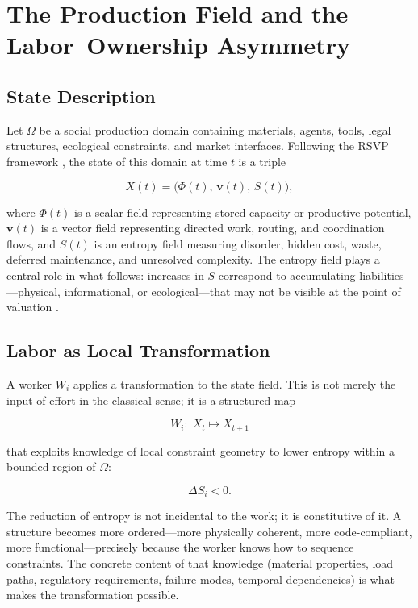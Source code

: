 \documentclass[12pt]{article}
\begin{document}
\section{The Production Field and the Labor--Ownership Asymmetry}

\subsection{State Description}

Let $\Omega$ be a social production domain containing materials, agents, tools, legal structures, ecological constraints, and market interfaces. Following the RSVP framework \cite{GeorgescuRoegen1971,Odum1994}, the state of this domain at time $t$ is a triple

\begin{equation}
X(t) = \bigl(\Phi(t),\, \mathbf{v}(t),\, S(t)\bigr),
\end{equation}

where $\Phi(t)$ is a scalar field representing stored capacity or productive potential, $\mathbf{v}(t)$ is a vector field representing directed work, routing, and coordination flows, and $S(t)$ is an entropy field measuring disorder, hidden cost, waste, deferred maintenance, and unresolved complexity. The entropy field plays a central role in what follows: increases in $S$ correspond to accumulating liabilities---physical, informational, or ecological---that may not be visible at the point of valuation \cite{Shannon1948,GeorgescuRoegen1971}.

\subsection{Labor as Local Transformation}

A worker $W_i$ applies a transformation to the state field. This is not merely the input of effort in the classical sense; it is a structured map

\begin{equation}
W_i:\; X_t \longmapsto X_{t+1}
\end{equation}

that exploits knowledge of local constraint geometry to lower entropy within a bounded region of $\Omega$:

\begin{equation}
\Delta S_i < 0.
\end{equation}

The reduction of entropy is not incidental to the work; it is constitutive of it. A structure becomes more ordered---more physically coherent, more code-compliant, more functional---precisely because the worker knows how to sequence constraints. The concrete content of that knowledge (material properties, load paths, regulatory requirements, failure modes, temporal dependencies) is what makes the transformation possible.
\end{document}

